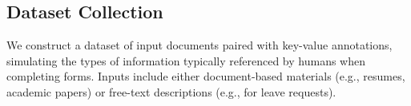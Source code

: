 \documentclass[sigconf, screen, review]{acmart}
\begin{document}


\subsection{Dataset Collection}

We construct a dataset of input documents paired with key-value annotations, simulating the types of information typically referenced by humans when completing forms. Inputs include either document-based materials (e.g., resumes, academic papers) or free-text descriptions (e.g., for leave requests).
\end{document}
